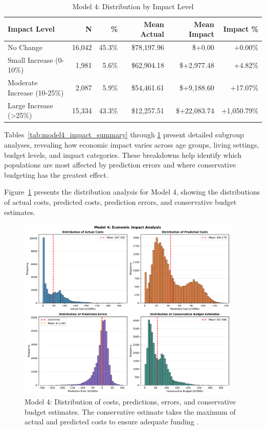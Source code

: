 \begin{table}[htbp]
\centering
\small
\caption{Model 4: Distribution by Impact Level \FiscalYear}
\label{tab:model4_impact_distribution}
\begin{tabular}{lrrrrr}
\toprule
\textbf{Impact Level} & \textbf{N} & \textbf{\%} & \textbf{Mean Actual} & \textbf{Mean Impact} & \textbf{Impact \%} \\
\midrule
No Change & 16,042 & 45.3\% & \$78,197.96 & \$+0.00 & +0.00\% \\
Small Increase (0-10\%) & 1,981 & 5.6\% & \$62,904.18 & \$+2,977.48 & +4.82\% \\
Moderate Increase (10-25\%) & 2,087 & 5.9\% & \$54,461.61 & \$+9,188.60 & +17.07\% \\
Large Increase (>25\%) & 15,334 & 43.3\% & \$12,257.51 & \$+22,083.74 & +1,050.79\% \\
\bottomrule
\end{tabular}
\end{table}

Tables~\ref{tab:model4_impact_summary} through \ref{tab:model4_impact_distribution} present detailed subgroup analyses, revealing how economic impact varies across age groups, living settings, budget levels, and impact categories. These breakdowns help identify which populations are most affected by prediction errors and where conservative budgeting has the greatest effect.

Figure~\ref{fig:model4_impact_histograms} presents the distribution analysis for Model 4, showing the distributions of actual costs, predicted costs, prediction errors, and conservative budget estimates.

\begin{figure}[htbp]
\centering
\includegraphics[width=0.95\textwidth]{figures/model_4_Impact_Histograms.pdf}
\caption{Model 4: Distribution of costs, predictions, errors, and conservative budget estimates. The conservative estimate takes the maximum of actual and predicted costs to ensure adequate funding \FiscalYear.}
\label{fig:model4_impact_histograms}
\end{figure}

